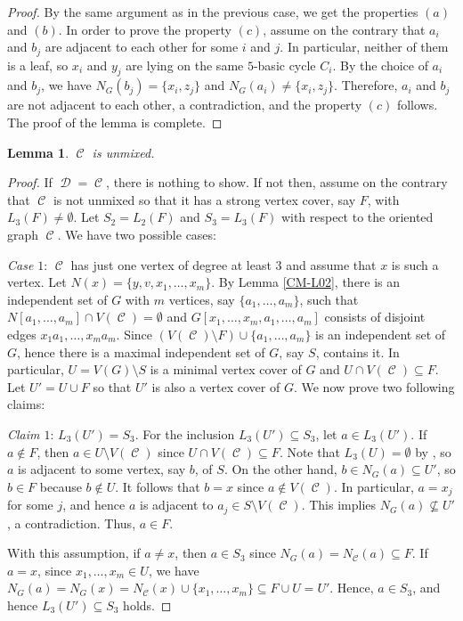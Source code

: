 \documentclass[12pt, amscd]{amsart}
\newtheorem{lem}[thm]{Lemma}
\theoremstyle{definition}
\DeclareMathOperator{\D}{\mathcal{D}}
\DeclareMathOperator{\C}{\mathcal{C}}
\newcommand{\0}{\bold{0}}
\begin{document}
\begin{proof}
By the same argument as in the previous case, we get the properties $(a)$ and $(b)$. In order to prove the property $(c)$, assume on the contrary that $a_i$ and $b_j$ are adjacent to each other for some $i$ and $j$. In particular, neither of them is a leaf, so $x_i$ and $y_j$ are lying on the same $5$-basic cycle $C_i$. By the choice of $a_i$ and $b_j$, we have $N_G(b_j) = \{x_i,z_j\}$ and $N_G(a_i) \ne \{x_i,z_j\}$. Therefore, $a_i$ and $b_j$ are not adjacent to each other, a contradiction, and the property $(c)$ follows. The proof of the lemma is complete.
\end{proof}

\begin{lem} \label{CM-L03} $\C$ is unmixed.
\end{lem}
\begin{proof} If $\D=\C$, there is nothing to show. If not then, assume on the contrary that $\C$ is not unmixed so that it has a strong vertex cover, say $F$, with $L_3(F)\ne\emptyset$. Let $S_2= L_2(F)$ and $S_3 = L_3(F)$ with respect to the oriented graph $\C$. We  have two possible cases:

{\it Case $1$}: $\C$ has just one vertex of degree at least $3$ and assume that $x$ is such a vertex. Let $N(x) = \{y,v,x_1,\ldots,x_m\}$. By Lemma \ref{CM-L02}, there is an independent set of $G$ with $m$ vertices, say $\{a_1,\ldots,a_m\}$, such that 
$N[a_1,\ldots,a_m]\cap V(\C)=\emptyset$ and $G[x_1,\ldots,x_m,a_1,\ldots,a_m]$ consists of disjoint edges $x_1a_1,\ldots,x_ma_m$. Since $(V(\C)\setminus F) \cup \{a_1,\ldots,a_m\}$ is an independent set of $G$, hence there is a maximal independent set of $G$, say $S$, contains it. In particular, $U = V(G)\setminus S$ is a minimal vertex cover of $G$ and $U\cap V(\C) \subseteq F$. Let $U' = U \cup F$ so that $U'$ is also a vertex cover of $G$.  We now prove two following claims: 

{\it Claim $1$}: $L_3(U') = S_3$. For the inclusion $L_3(U') \subseteq S_3$, let $a\in L_3(U')$. If $a\notin F$, then $a\in U\setminus V(\C)$ since $U\cap V(\C) \subseteq F$. Note that $L_3(U)=\emptyset$ by \cite[Proposition 6]{PRT}, so $a$ is adjacent to some vertex, say $b$, of $S$. On the other hand, $b\in N_G(a)\subseteq U'$, so  $b\in F$ because $b\notin U$. It follows that $b=x$ since $a\notin V(\C)$. In particular, $a = x_j$ for some $j$, and hence  $a$ is adjacent to $a_j\in S\setminus V(\C)$. This implies $N_G(a)\not \subseteq U'$, a contradiction. Thus, $a\in F$.

With this assumption, if  $a\ne x$, then $a\in S_3$ since $N_G(a) = N_{\C}(a)\subseteq F$. If $a = x$, since $x_1,\ldots,x_m\in U$, we have
$N_G(a)=N_G(x) = N_{\C}(x) \cup \{x_1,\ldots,x_m\} \subseteq F \cup U = U'$. Hence, $a\in S_3$, and hence  $L_3(U') \subseteq S_3$ holds. 


\end{proof}
\end{document}
